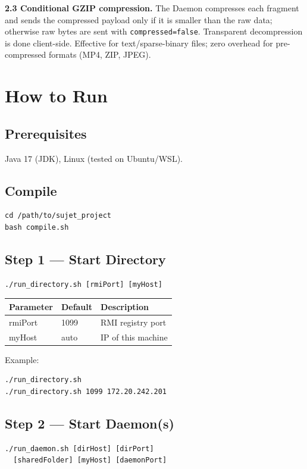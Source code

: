 \documentclass[10pt,twocolumn,a4paper]{article}
\begin{document}
\textbf{2.3 Conditional GZIP compression.}
The Daemon compresses each fragment and sends the compressed payload only if it is smaller than the raw data; otherwise raw bytes are sent with \texttt{compressed=false}. Transparent decompression is done client-side. Effective for text/sparse-binary files; zero overhead for pre-compressed formats (MP4, ZIP, JPEG).

\section{How to Run}

\subsection{Prerequisites}
Java 17 (JDK), Linux (tested on Ubuntu/WSL).

\subsection{Compile}
\begin{lstlisting}
cd /path/to/sujet_project
bash compile.sh
\end{lstlisting}

\subsection{Step 1 --- Start Directory}
\begin{lstlisting}
./run_directory.sh [rmiPort] [myHost]
\end{lstlisting}

\begin{table}[H]
\centering\scriptsize
\begin{tabular}{@{}lll@{}}
\toprule
\textbf{Parameter} & \textbf{Default} & \textbf{Description} \\
\midrule
rmiPort & 1099 & RMI registry port \\
myHost  & auto & IP of this machine \\
\bottomrule
\end{tabular}
\end{table}

Example:
\begin{lstlisting}
./run_directory.sh
./run_directory.sh 1099 172.20.242.201
\end{lstlisting}

\subsection{Step 2 --- Start Daemon(s)}
\begin{lstlisting}
./run_daemon.sh [dirHost] [dirPort]
  [sharedFolder] [myHost] [daemonPort]
\end{lstlisting}
\end{document}
